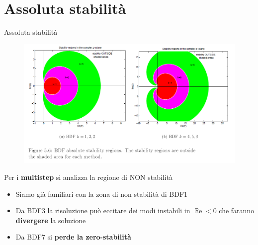 \documentclass[aspectratio=169, 10pt, handout,usenames,dvipsnames]{beamer}
\begin{document}
 \section{Assoluta stabilità}%
    \begin{frame}{Assoluta stabilità}
        \begin{figure}
        \centering
        \includegraphics[width=.7\linewidth]{fig7.png}
        \label{fig:abs_stability}
        \end{figure}
        Per i \textbf{multistep} si analizza la regione di NON stabilità
        \begin{itemize}
            \item Siamo già familiari con la zona di non stabilità di BDF1
            \item Da BDF3 la risoluzione può eccitare dei modi instabili in $\operatorname{\mathbb{R}e}<0$ che faranno \textbf{divergere} la soluzione
            \item Da BDF7 si \textbf{perde la zero-stabilità}
        \end{itemize}
    \end{frame}
    
\end{document}
